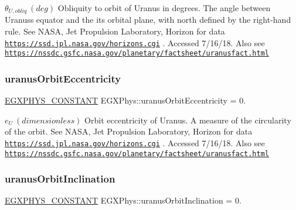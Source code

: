 $ \theta_{U,obliq} \ (deg)$ Obliquity to orbit of Uranus in degrees. The angle between Uranus\textquotesingle{}s equator and the it\textquotesingle{}s orbital plane, with north defined by the right-\/hand rule. See N\+A\+SA, Jet Propulsion Laboratory, Horizon for data \href{https://ssd.jpl.nasa.gov/horizons.cgi}{\tt https\+://ssd.\+jpl.\+nasa.\+gov/horizons.\+cgi} . Accessed 7/16/18. Also see \href{https://nssdc.gsfc.nasa.gov/planetary/factsheet/uranusfact.html}{\tt https\+://nssdc.\+gsfc.\+nasa.\+gov/planetary/factsheet/uranusfact.\+html} \mbox{\label{group___e_g_x_phys-_constants-_astrophysics-_solar_system-_uranus-_orbit_ga449e9b71817fed811304a12e2356c1b8}} 
\subsubsection{\texorpdfstring{uranus\+Orbit\+Eccentricity}{uranusOrbitEccentricity}}
{\footnotesize\ttfamily \mbox{\hyperlink{group___e_g_x_phys-_constants-_macros_ga76980d288494ce1714c9ac68a95ba702}{E\+G\+X\+P\+H\+Y\+S\+\_\+\+C\+O\+N\+S\+T\+A\+NT}} E\+G\+X\+Phys\+::uranus\+Orbit\+Eccentricity = 0.}

$ e_{U} \ (dimensionless)$ Orbit eccentricity of Uranus. A measure of the circularity of the orbit. See N\+A\+SA, Jet Propulsion Laboratory, Horizon for data \href{https://ssd.jpl.nasa.gov/horizons.cgi}{\tt https\+://ssd.\+jpl.\+nasa.\+gov/horizons.\+cgi} . Accessed 7/16/18. Also see \href{https://nssdc.gsfc.nasa.gov/planetary/factsheet/uranusfact.html}{\tt https\+://nssdc.\+gsfc.\+nasa.\+gov/planetary/factsheet/uranusfact.\+html} \mbox{\label{group___e_g_x_phys-_constants-_astrophysics-_solar_system-_uranus-_orbit_ga52ecbdab9b82b86f84905cbd0048f75b}} 
\subsubsection{\texorpdfstring{uranus\+Orbit\+Inclination}{uranusOrbitInclination}}
{\footnotesize\ttfamily \mbox{\hyperlink{group___e_g_x_phys-_constants-_macros_ga76980d288494ce1714c9ac68a95ba702}{E\+G\+X\+P\+H\+Y\+S\+\_\+\+C\+O\+N\+S\+T\+A\+NT}} E\+G\+X\+Phys\+::uranus\+Orbit\+Inclination = 0.}

